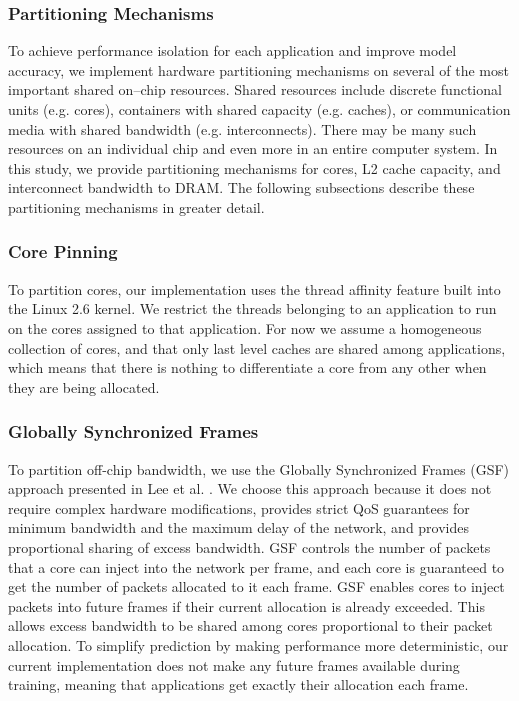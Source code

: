 \subsubsection{Partitioning Mechanisms}
To achieve performance isolation for each application and improve model accuracy, we implement hardware partitioning mechanisms on several of the most important shared on--chip  resources. Shared resources include discrete functional units (e.g. cores), containers with shared capacity (e.g. caches), or communication media with shared bandwidth (e.g. interconnects).  There may be many such resources on an individual chip and even more in an entire computer system. In this study, we provide partitioning mechanisms for cores, L2 cache capacity, and interconnect bandwidth to DRAM.
 The following subsections describe these partitioning mechanisms in greater detail.


\subsubsection*{Core Pinning}
To partition cores, our implementation uses the thread affinity feature built into the Linux 2.6 kernel.  We restrict the threads belonging to an application to run on the cores assigned to that application.  For now we assume a homogeneous collection of cores, and that only last level caches are shared among applications, which means that there is nothing to differentiate a core from any other when they are being allocated.

\subsubsection*{Globally Synchronized Frames}
To partition off-chip bandwidth, we use the Globally Synchronized Frames (GSF) approach presented in Lee et al. \cite{gsf}.  We choose this approach because it does not require complex hardware modifications, provides strict QoS guarantees for minimum bandwidth and the maximum delay of the network, and provides proportional sharing of excess bandwidth.  GSF controls the number of packets that a core can inject into the network per frame, and each core is guaranteed to get the number of packets allocated to it each frame.  GSF enables cores to inject packets into future frames if their current allocation is already exceeded.  This allows excess bandwidth to be shared among cores proportional to their packet allocation.  To simplify prediction by making performance more deterministic, our current implementation does not make any future frames available during training, meaning that applications get exactly their allocation each frame.


